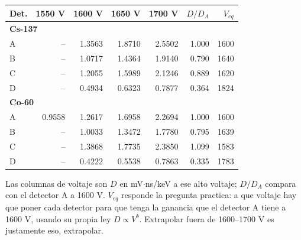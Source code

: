 \begin{tabular}{lrrrrrr}
\toprule
\textbf{Det.} & \textbf{1550 V} & \textbf{1600 V} & \textbf{1650 V} & \textbf{1700 V} & \textbf{$D/D_A$} & \textbf{$V_{eq}$} \\
\midrule
\midrule
\multicolumn{7}{l}{\textbf{Cs-137}} \\
A & -- & 1.3563 & 1.8710 & 2.5502 & 1.000 & 1600 \\
B & -- & 1.0717 & 1.4364 & 1.9140 & 0.790 & 1640 \\
C & -- & 1.2055 & 1.5989 & 2.1246 & 0.889 & 1620 \\
D & -- & 0.4934 & 0.6323 & 0.7877 & 0.364 & 1824 \\
\midrule
\multicolumn{7}{l}{\textbf{Co-60}} \\
A & 0.9558 & 1.2617 & 1.6958 & 2.2694 & 1.000 & 1600 \\
B & -- & 1.0033 & 1.3472 & 1.7780 & 0.795 & 1639 \\
C & -- & 1.3868 & 1.7735 & 2.3850 & 1.099 & 1583 \\
D & -- & 0.4222 & 0.5538 & 0.7863 & 0.335 & 1783 \\
\bottomrule
\end{tabular}
\par\smallskip
\begin{minipage}{0.95\linewidth}\footnotesize Las columnas de voltaje son $D$ en mV$\cdot$ns/keV a ese alto voltaje; $D/D_A$ compara con el detector A a 1600 V. $V_{eq}$ responde la pregunta practica: a que voltaje hay que poner cada detector para que tenga la ganancia que el detector A tiene a 1600 V, usando su propia ley $D \propto V^{b}$. Extrapolar fuera de 1600--1700 V es justamente eso, extrapolar.\end{minipage}
